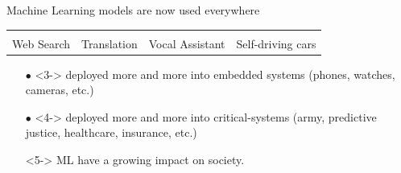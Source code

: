 \begin{frame}{Machine Learning models are now used everywhere}
{\begin{table}
{\begin{tabular}{
	cccc
      }
\begin{minipage}{0.22\textwidth}
	\end{minipage} \\[0.5cm]
	Web Search & Translation & Vocal Assistant & Self-driving cars
      \end{tabular}
    }
  \end{table}
  }

  {\small
  \begin{itemize}
    \item[$\bullet$]<3-> deployed more and more into embedded systems (phones, watches, cameras, etc.) 
    \item[$\bullet$]<4-> deployed more and more into critical-systems (army, predictive justice, healthcare, insurance, etc.)
    \item[\orange{$\rightarrow$}]<5-> ML have a growing impact on society. 
  \end{itemize}
  }






\end{frame}




